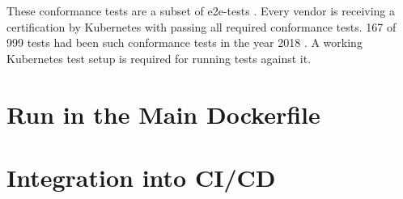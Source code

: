 These conformance tests are a subset of e2e-tests \cite[~p.8]{Omichi2018}. Every vendor is receiving a certification by Kubernetes with passing all required conformance tests. 167 of 999 tests had been such conformance tests in the year 2018 \cite[~p.9]{Omichi2018}.
A working Kubernetes test setup is required for running tests against it.

\section{Run in the Main Dockerfile}

\section{Integration into CI/CD}